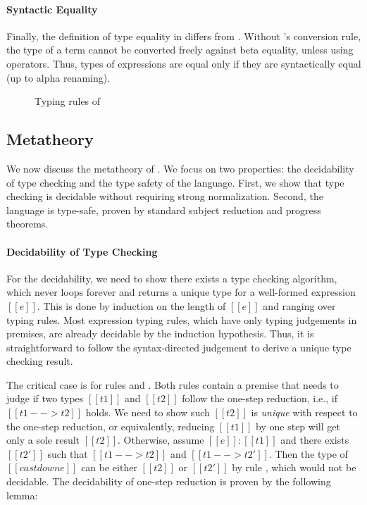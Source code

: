 \paragraph{Syntactic Equality}
Finally, the definition of type equality in \ecore differs from
\cc. Without \cc's conversion rule, the type of a term cannot be
converted freely against beta equality, unless using \cast
operators. Thus, types of expressions are equal only if they are
syntactically equal (up to alpha renaming).

\begin{figure}
    \ottdefnctx{}\ottinterrule
    \ottdefnexpr{}
    \caption{Typing rules of \ecore}
    \label{fig:ecore:typing}
\end{figure}

\subsection{Metatheory}\label{sec:ecore:meta}
We now discuss the metatheory of \ecore. We focus on two properties:
the decidability of type checking and the type safety of the
language. First, we show that type checking \ecore is decidable
without requiring strong normalization. Second, the language is type-safe, 
proven by standard subject reduction and progress theorems.

\paragraph{Decidability of Type Checking}
For the decidability, we need to show there exists a type checking
algorithm, which never loops forever and returns a unique type for a
well-formed expression $[[e]]$. This is done by induction on the
length of $[[e]]$ and ranging over typing rules. Most expression
typing rules, which have only typing judgements in premises, are
already decidable by the induction hypothesis. Thus, it is
straightforward to follow the syntax-directed judgement to derive a
unique type checking result.

The critical case is for rules  and
.  Both rules contain a premise that needs to
judge if two types $[[t1]]$ and $[[t2]]$ follow the one-step
reduction, i.e., if $[[t1 --> t2]]$ holds. We need to show such
$[[t2]]$ is \emph{unique} with respect to the one-step reduction, or
equivalently, reducing $[[t1]]$ by one step will get only a sole
result $[[t2]]$. Otherwise, assume $[[e]]:[[t1]]$ and there exists
$[[t2']]$ such that $[[t1 --> t2]]$ and $[[t1 --> t2']]$. Then the
type of $[[castdown e]]$ can be either $[[t2]]$ or $[[t2']]$ by rule
, which would not be decidable. The decidability
of one-step reduction is
proven by the following lemma:

